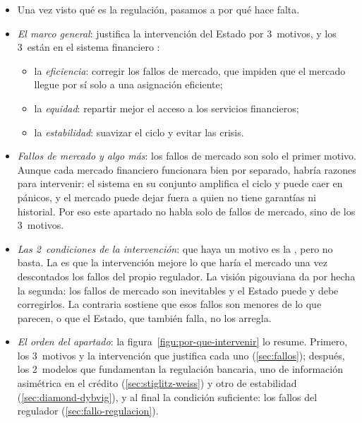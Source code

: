 \documentclass[11pt]{article}
\begin{document}
\begin{itemize}
\item Una vez visto qué es la regulación, pasamos a por qué hace falta.
\item \emph{El marco general}: \textcite{Musgrave1959Theory} justifica la intervención del Estado por 3~motivos, y los 3~están en el sistema financiero :
  \begin{itemize}
  \item la \emph{eficiencia}: corregir los fallos de mercado, que impiden que el mercado llegue por sí solo a una asignación eficiente;
  \item la \emph{equidad}: repartir mejor el acceso a los servicios financieros;
  \item la \emph{estabilidad}: suavizar el ciclo y evitar las crisis.
  \end{itemize}
\item \emph{Fallos de mercado y algo más}: los fallos de mercado son solo el primer motivo. Aunque cada mercado financiero funcionara bien por separado, habría razones para intervenir: el sistema en su conjunto amplifica el ciclo y puede caer en pánicos, y el mercado puede dejar fuera a quien no tiene garantías ni historial. Por eso este apartado no habla solo de fallos de mercado, sino de los 3~motivos.
\item \emph{Las 2~condiciones de la intervención}: que haya un motivo es la , pero no basta. La  es que la intervención mejore lo que haría el mercado una vez descontados los fallos del propio regulador. La visión pigouviana da por hecha la segunda: los fallos de mercado son inevitables y el Estado puede y debe corregirlos. La contraria sostiene que esos fallos son menores de lo que parecen, o que el Estado, que también falla, no los arregla.
\item \emph{El orden del apartado}: la figura~\ref{figu:por-que-intervenir} lo resume. Primero, los 3~motivos y la intervención que justifica cada uno (\ref{sec:fallos}); después, los 2~modelos que fundamentan la regulación bancaria, uno de información asimétrica en el crédito (\ref{sec:stiglitz-weiss}) y otro de estabilidad (\ref{sec:diamond-dybvig}), y al final la condición suficiente: los fallos del regulador (\ref{sec:fallo-regulacion}).
\end{itemize}

\begin{infografia}[H]
\centering
\caption{Por qué se interviene en el sistema financiero: de los motivos a los instrumentos}\label{figu:por-que-intervenir}
\end{infografia}
\end{document}
